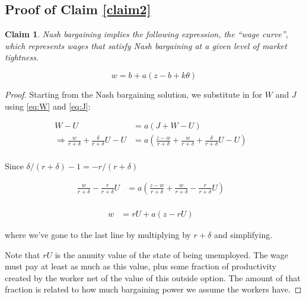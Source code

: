 \documentclass[12pt]{article}
\newtheorem*{Claim}{Claim}
\begin{document}
\subsection{Proof of Claim \ref{claim2}}\label{claim2proof}

\begin{Claim}

Nash bargaining implies the following expression, the ``wage curve'', which represents wages that satisfy Nash bargaining at a given level of market tightness.

\begin{equation}\label{eq:WC}
	w = b + a (z - b +  k \theta) \tag{WC}
\end{equation}

\end{Claim}


\begin{proof}
Starting from the Nash bargaining solution, we substitute in for $W$ and $J$ using \eqref{eq:W} and \eqref{eq:J}:

\begin{align*}
	W - U &= a (J + W - U) &  \\
\Rightarrow	\frac{w}{r + \delta} + \frac{\delta}{r + \delta} U - U &= a \left(\frac{z - w}{r + \delta}  + \frac{w}{r + \delta} + \frac{\delta}{r + \delta} U - U \right)&\\
\end{align*}





Since $\delta/(r + \delta) - 1 = -r/(r+\delta)$

\begin{align*}
	\frac{w}{r + \delta} - \frac{r}{r + \delta} U &= a \left(\frac{z - w}{r + \delta}  + \frac{w}{r + \delta}  - \frac{r}{r + \delta} U \right) &\\
\end{align*}

\begin{align}\label{eq:rU}
		w &= rU + a (z - r U) & \tag{$\star$}
\end{align}

where we've gone to the last line by multiplying by $r + \delta$ and simplifying.  

Note that $rU$ is the annuity value of the state of being unemployed.  The wage must pay at least as much as this value, plus some fraction of productivity created by the worker net of the value of this outside option. The amount of that fraction is related to how much bargaining power we assume the workers have.


\end{proof}
\end{document}
